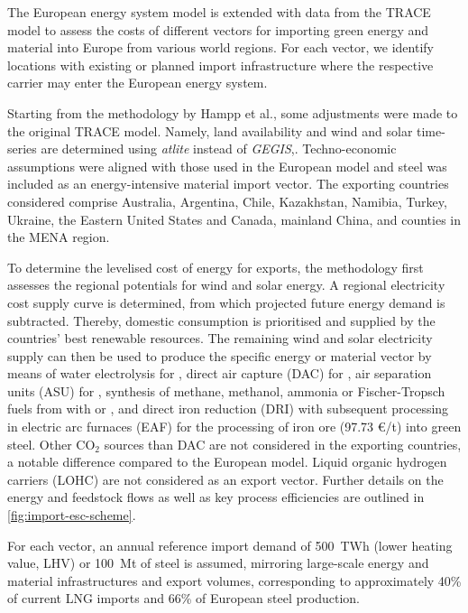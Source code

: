 The European energy system model is extended with data from the TRACE model
\cite{hamppImportOptions2023} to assess the costs of different vectors for
importing green energy and material into Europe from various world regions. For
each vector, we identify locations with existing or planned import
infrastructure where the respective carrier may enter the European energy
system. 

Starting from the methodology by Hampp et al.\cite{hamppImportOptions2023}, some
adjustments were made to the original TRACE model. Namely, land availability and
wind and solar time-series are determined using
\textit{atlite}\cite{hofmannAtliteLightweight2021} instead of
\textit{GEGIS},\cite{mattssonAutopilotEnergy2021}. Techno-economic assumptions
were aligned with those used in the European model and steel was included as an
energy-intensive material import vector. The exporting countries considered
comprise Australia, Argentina, Chile, Kazakhstan, Namibia, Turkey, Ukraine, the
Eastern United States and Canada, mainland China, and counties in the MENA
region.

To determine the levelised cost of energy for exports, the methodology first
assesses the regional potentials for wind and solar energy. A regional
electricity cost supply curve is determined, from which projected future energy
demand is subtracted. Thereby, domestic consumption is prioritised and supplied
by the countries' best renewable resources. The remaining wind and solar
electricity supply can then be used to produce the specific energy or material
vector by means of water electrolysis for , direct air capture (DAC) for
, air separation units (ASU) for , synthesis of methane,
methanol, ammonia or Fischer-Tropsch fuels from  with  or
, and  direct iron reduction (DRI) with subsequent processing in
electric arc furnaces (EAF) for the processing of iron ore (97.73 \euro{}/t)
into green steel. Other CO$_2$ sources than DAC are not considered in the
exporting countries, a notable difference compared to the European model. Liquid
organic hydrogen carriers (LOHC) are not considered as an export vector. Further
details on the energy and feedstock flows as well as key process efficiencies
are outlined in \cref{fig:import-esc-scheme}.

For each vector, an annual reference import demand of 500~TWh (lower heating
value, LHV) or 100~Mt of steel is assumed, mirroring large-scale energy and
material infrastructures and export volumes, corresponding to approximately 40\%
of current LNG
imports\cite{instituteforenergyeconomicsandfinancialanalysisEuropeanLNG2023} and
66\% of European steel
production.\cite{eurofer-theeuropeansteelassociationEuropeanSteel2023}

